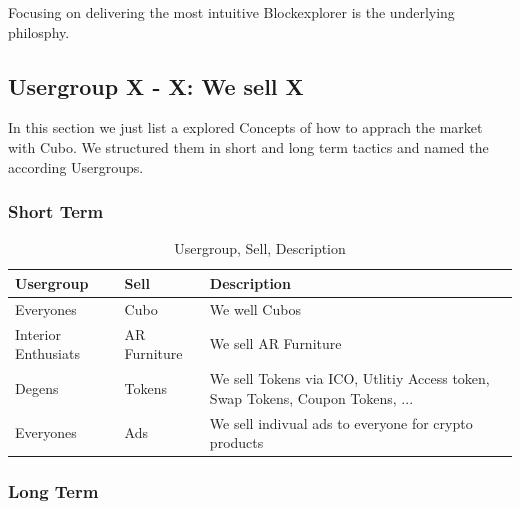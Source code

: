 \documentclass{report}
\begin{document}
Focusing on delivering the most intuitive Blockexplorer is the underlying philosphy.

\newpage

\subsection{Usergroup X - X: We sell X}

In this section we just list a explored Concepts of how to apprach the market with Cubo.
We structured them in short and long term tactics and named the according Usergroups.

\subsubsection{Short Term}

\begin{table}[hbp]
	\centering
	\caption{Usergroup, Sell, Description}
	\label{tab:salesShort}
	\renewcommand{\arraystretch}{1.25}
	\begin{tabularx}{\textwidth}{p{3.5cm}|p{3cm}|p{4.5cm}}
		\hline
		\textbf{Usergroup}  & \textbf{Sell} & \textbf{Description}                                                          \\
		\hline
		\hline
		Everyones           & Cubo          & We well Cubos                                                                 \\
		\hline
		Interior Enthusiats & AR Furniture  & We sell AR Furniture                                                          \\
		\hline
		Degens              & Tokens        & We sell Tokens via ICO, Utlitiy Access token, Swap Tokens, Coupon Tokens, ... \\
		\hline
		Everyones           & Ads           & We sell indivual ads to everyone for crypto products                          \\
		\hline
	\end{tabularx}
\end{table}

\subsubsection{Long Term}
\end{document}
